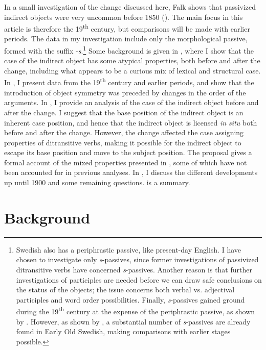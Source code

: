 \documentclass[output=paper]{langscibook}
\begin{document}
In a small investigation of the change discussed here, Falk shows that passivized indirect objects were very uncommon before 1850 (\citeyear[167]{Falk1997}). The main focus in this article is therefore the 19\textsuperscript{th} century, but comparisons will be made with earlier periods. The data in my investigation include only the morphological passive, formed with the suffix -\textit{s}.\footnote{Swedish also has a periphrastic passive, like present-day English. I have chosen to investigate only \textit{s}{}-passives, since former investigations of passivized ditransitive verbs have concerned \textit{s}{}-passives. Another reason is that further investigations of participles are needed before we can draw safe conclusions on the status of the objects; the issue concerns both verbal vs. adjectival participles and word order possibilities. Finally, \textit{s}{}-passives gained ground during the 19\textsuperscript{th} century at the expense of the periphrastic passive, as shown by \citet{Kirri1975}. However, as shown by \citet{Holm1952}, a substantial number of \textit{s}{}-passives are already found in Early Old Swedish, making comparisons with earlier stages possible.} Some background is given in , where I show that the case of the indirect object has some atypical properties, both before and after the change, including what appears to be a curious mix of lexical and structural case. In , I present data from the 19\textsuperscript{th} century and earlier periods, and show that the introduction of object symmetry was preceded by changes in the order of the arguments. In , I provide an analysis of the case of the indirect object before and after the change. I suggest that the base position of the indirect object is an inherent case position, and hence that the indirect object is licensed \textit{in situ} both before and after the change. However, the change affected the case assigning properties of ditransitive verbs, making it possible for the indirect object to escape its base position and move to the subject position. The proposal gives a formal account of the mixed properties presented in , some of which have not been accounted for in previous analyses. In , I discuss the different developments up until 1900 and some remaining questions.  is a summary.

\section{Background}\label{sec:falk:2}
\end{document}
